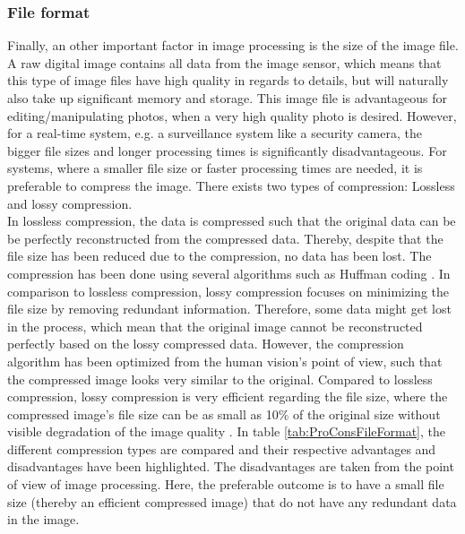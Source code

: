\subsubsection*{File format}
Finally, an other important factor in image processing is the size of the image file. A raw digital image contains all data from the image sensor, which means that this type of image files have high quality in regards to details, but will naturally also take up significant memory and storage. This image file is advantageous for editing/manipulating photos, when a very high quality photo is desired. However, for a real-time system, e.g. a surveillance system like a security camera, the bigger file sizes and longer processing times is significantly disadvantageous. For systems, where a smaller file size or faster processing times are needed, it is preferable to compress the image. There exists two types of compression: Lossless and lossy compression. \\

In lossless compression, the data is compressed such that the original data can be be perfectly reconstructed from the compressed data. Thereby, despite that the file size has been reduced due to the compression, no data has been lost. The compression has been done using several algorithms such as Huffman coding \citep{Lossless49:online}. In comparison to lossless compression, lossy compression focuses on minimizing the file size by removing redundant information. Therefore, some data might get lost in the process, which mean that the original image cannot be reconstructed perfectly based on the lossy compressed data. However, the compression algorithm has been optimized from the human vision's point of view, such that the compressed image looks very similar to the original. Compared to lossless compression, lossy compression is very efficient regarding the file size, where the compressed image's file size can be as small as 10\% of the original size without visible degradation of the image quality \citep{LossyDat32:online}. In table \ref{tab:ProConsFileFormat}, the different compression types are compared and their respective advantages and disadvantages have been highlighted. The disadvantages are taken from the point of view of image processing. Here, the preferable outcome is to have a small file size (thereby an efficient compressed image) that do not have any redundant data in the image. 

